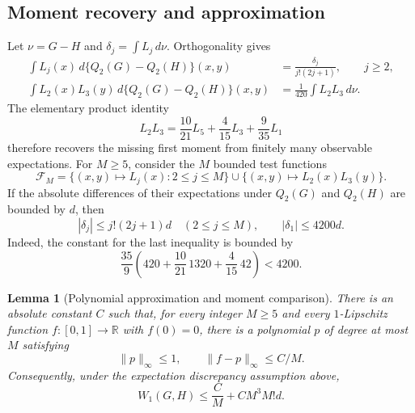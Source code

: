 \documentclass[11pt,letterpaper]{article}
\newtheorem{lemma}[theorem]{Lemma}
\theoremstyle{definition}
\theoremstyle{remark}
\newcommand{\1}{\mathbf 1}
\begin{document}
\subsection{Moment recovery and approximation}

Let $\nu=G-H$ and $\delta_j=\int L_j\,d\nu$.  Orthogonality gives
\begin{align}
 \int L_j(x)\,d\{Q_2(G)-Q_2(H)\}(x,y)
   &=\frac{\delta_j}{j!(2j+1)},\qquad j\ge2,
   \label{p10:eq:quant-visible-moment}\\
 \int L_2(x)L_3(y)\,d\{Q_2(G)-Q_2(H)\}(x,y)
   &=\frac1{420}\int L_2L_3\,d\nu.
   \label{p10:eq:quant-missing-moment}
\end{align}
The elementary product identity
\begin{equation}\label{p10:eq:quant-product-identity}
 L_2L_3=\frac{10}{21}L_5+\frac4{15}L_3+\frac9{35}L_1
\end{equation}
therefore recovers the missing first moment from finitely many observable
expectations.  For $M\ge5$, consider the $M$ bounded test functions
\[
 \mathcal F_M=
 \{(x,y)\mapsto L_j(x):2\le j\le M\}
 \cup\{(x,y)\mapsto L_2(x)L_3(y)\}.
\]
If the absolute differences of their expectations under $Q_2(G)$ and
$Q_2(H)$ are bounded by $d$, then
\begin{equation}\label{p10:eq:quant-moment-bounds}
 |\delta_j|\le j!(2j+1)d\quad(2\le j\le M),
 \qquad |\delta_1|\le4200d.
\end{equation}
Indeed, the constant for the last inequality is bounded by
\[
 \frac{35}{9}
 \left(420+\frac{10}{21}\,1320+\frac4{15}\,42\right)<4200.
\]

\begin{lemma}[Polynomial approximation and moment comparison]
\label{p10:lem:quant-jackson}
There is an absolute constant $C$ such that, for every integer $M\ge5$
and every $1$-Lipschitz function $f:[0,1]\to\mathbb R$ with $f(0)=0$,
there is a polynomial $p$ of degree at most $M$ satisfying
\[
 \|p\|_\infty\le1,\qquad \|f-p\|_\infty\le C/M.
\]
Consequently, under the expectation discrepancy assumption above,
\begin{equation}\label{p10:eq:quant-finite-comparison}
 W_1(G,H)\le\frac C M+C M^3M!d.
\end{equation}
\end{lemma}
\end{document}
